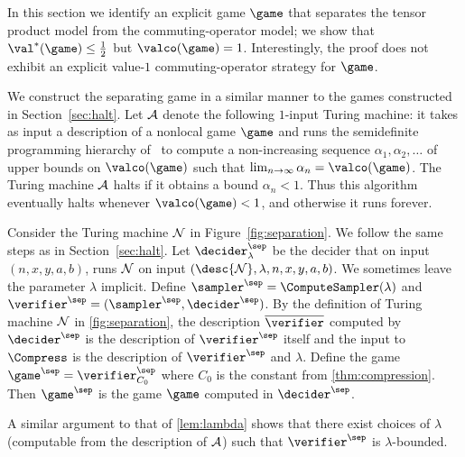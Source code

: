 In this section we identify an explicit game $\game$ that separates the tensor
product model from the commuting-operator model; we show that $\val^*(\game)
\leq \frac{1}{2}$ but $\valco(\game) = 1$.
Interestingly, the proof does not exhibit an explicit value-$1$
commuting-operator strategy for $\game$.

We construct the separating game in a similar manner to the games constructed in
Section~\ref{sec:halt}.
Let $\cal{A}$ denote the following $1$-input Turing machine: it takes as input a
description of a nonlocal game $\game$ and runs the semidefinite programming
hierarchy of~\cite{navascues2008convergent,doherty2008quantum} to compute a
non-increasing sequence $\alpha_1,\alpha_2,\ldots$ of upper bounds on
$\valco(\game)$ such that $\lim_{n \to \infty} \alpha_n = \valco(\game)$.
The Turing machine $\cal{A}$ halts if it obtains a bound $\alpha_n < 1$.
Thus this algorithm eventually halts whenever $\valco(\game) < 1$, and
otherwise it runs forever.

Consider the Turing machine $\cal{N}$ in Figure~\ref{fig:separation}.
We follow the same steps as in Section~\ref{sec:halt}.
Let $\decider^\sep_\lambda$ be the decider that on input $(n, x, y, a, b)$,
runs $\cal{N}$ on input $(\desc{\cal{N}}, \lambda, n, x, y, a, b)$. We
sometimes leave the parameter $\lambda$ implicit.
Define $\sampler^\sep = \ComputeSampler(\lambda)$ and $\verifier^\sep =
(\sampler^\sep, \decider^\sep)$. By the definition of Turing machine $\cal{N}$
in \cref{fig:separation}, the description $\overline{\verifier}$ computed by
$\decider^\sep$ is the description of $\verifier^\sep$ itself and the input to
$\Compress$ is the description of $\verifier^\sep$ and $\lambda$.
Define the game $\game^\sep = \verifier^\sep_{C_0}$ where $C_0$ is the constant
from \cref{thm:compression}.
Then $\game^\sep$ is the game $\game$ computed in $\decider^\sep$.

A similar argument to that of \cref{lem:lambda} shows that there exist choices
of $\lambda$ (computable from the description of $\cal{A}$) such that
$\verifier^\sep$ is $\lambda$-bounded.



